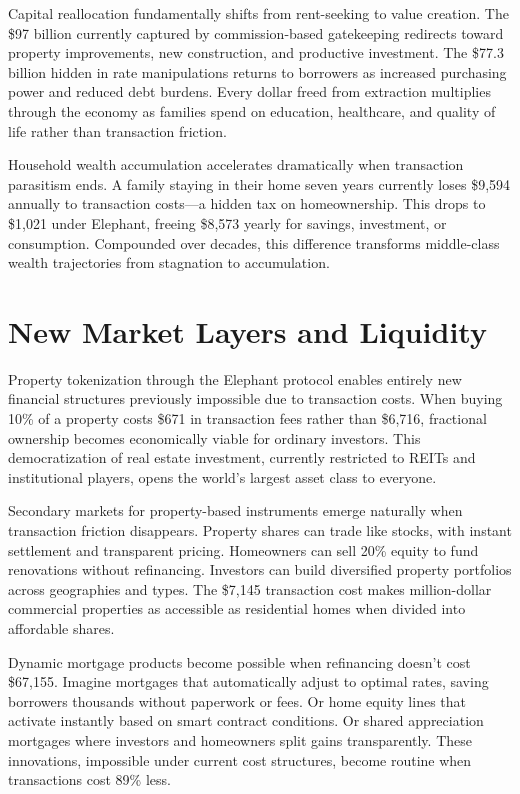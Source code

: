 Capital reallocation fundamentally shifts from rent-seeking to value creation. The \$97 billion currently captured by commission-based gatekeeping redirects toward property improvements, new construction, and productive investment. The \$77.3 billion hidden in rate manipulations returns to borrowers as increased purchasing power and reduced debt burdens. Every dollar freed from extraction multiplies through the economy as families spend on education, healthcare, and quality of life rather than transaction friction.

Household wealth accumulation accelerates dramatically when transaction parasitism ends. A family staying in their home seven years currently loses \$9,594 annually to transaction costs—a hidden tax on homeownership. This drops to \$1,021 under Elephant, freeing \$8,573 yearly for savings, investment, or consumption. Compounded over decades, this difference transforms middle-class wealth trajectories from stagnation to accumulation.

\section{New Market Layers and Liquidity}

Property tokenization through the Elephant protocol enables entirely new financial structures previously impossible due to transaction costs. When buying 10\% of a property costs \$671 in transaction fees rather than \$6,716, fractional ownership becomes economically viable for ordinary investors. This democratization of real estate investment, currently restricted to REITs and institutional players, opens the world's largest asset class to everyone.

Secondary markets for property-based instruments emerge naturally when transaction friction disappears. Property shares can trade like stocks, with instant settlement and transparent pricing. Homeowners can sell 20\% equity to fund renovations without refinancing. Investors can build diversified property portfolios across geographies and types. The \$7,145 transaction cost makes million-dollar commercial properties as accessible as residential homes when divided into affordable shares.

Dynamic mortgage products become possible when refinancing doesn't cost \$67,155. Imagine mortgages that automatically adjust to optimal rates, saving borrowers thousands without paperwork or fees. Or home equity lines that activate instantly based on smart contract conditions. Or shared appreciation mortgages where investors and homeowners split gains transparently. These innovations, impossible under current cost structures, become routine when transactions cost 89\% less.

